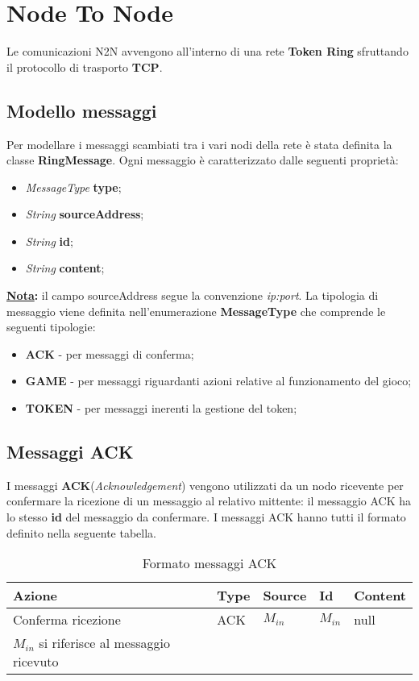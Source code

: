 \documentclass[a4paper]{report}
\begin{document}
\section{Node To Node}
Le comunicazioni N2N avvengono all'interno di una rete \textbf{Token Ring} sfruttando il protocollo di trasporto \textbf{TCP}.

\subsection{Modello messaggi}
Per modellare i messaggi scambiati tra i vari nodi della rete è stata definita la classe \textbf{RingMessage}. Ogni messaggio è caratterizzato dalle seguenti proprietà:
\begin{itemize}
	\item \textit{MessageType} \textbf{type};
	\item \textit{String} \textbf{sourceAddress};
	\item \textit{String} \textbf{id};
	\item \textit{String} \textbf{content};
\end{itemize}
\textbf{\underline{Nota}:} il campo sourceAddress segue la convenzione \textit{ip:port}.
La tipologia di messaggio viene definita nell'enumerazione \textbf{MessageType} che comprende le seguenti tipologie:
\begin{itemize}
	\item \textbf{ACK} - per messaggi di conferma;
	\item \textbf{GAME} - per messaggi riguardanti azioni relative al funzionamento del gioco;
	\item \textbf{TOKEN} - per messaggi inerenti la gestione del token;
\end{itemize}

\subsection{Messaggi ACK}
I messaggi \textbf{ACK}(\textit{Acknowledgement}) vengono utilizzati da un nodo ricevente per confermare la ricezione di un messaggio al relativo mittente: il messaggio ACK ha lo stesso \textbf{id} del messaggio da confermare.\newline
I messaggi ACK hanno tutti il formato definito nella seguente tabella.

\begin{table}[H]
	\centering
	\caption{Formato messaggi ACK}
	\label{format-ack}
	{\renewcommand{\arraystretch}{1.8}
	\begin{tabular}{@{}lllll@{}}
		\toprule
		\rowcolor[HTML]{FFCCC9} 
		{\color[HTML]{333333} Azione} & {\color[HTML]{333333} Type} & {\color[HTML]{333333} Source} & {\color[HTML]{333333} Id} & {\color[HTML]{333333} Content} \\ \midrule
		Conferma ricezione            & ACK                         & $M_{in}$                  & $M_{in}$              & null                           \\ \bottomrule
		\small{$M_{in}$ si riferisce al messaggio ricevuto}
	\end{tabular}
	}
\end{table}
\end{document}
